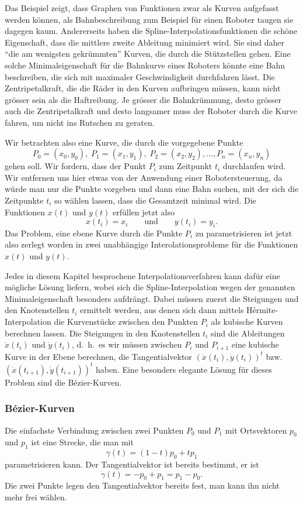 Das Beispiel zeigt, dass Graphen von Funktionen zwar als Kurven aufgefasst
werden können, als Bahnbeschreibung zum Beispiel für einen Roboter taugen
sie dagegen kaum.
Andererseits haben die Spline-Interpolationsfunktionen die schöne
Eigenschaft, dass die mittlere zweite Ableitung minimiert wird.
Sie sind daher ``die am wenigsten gekrümmten'' Kurven, die durch die
Stützstellen gehen. 
Eine solche Minimaleigenschaft für die Bahnkurve eines Roboters könnte eine
Bahn beschreiben, die sich mit maximaler Geschwindigkeit durchfahren lässt.
Die Zentripetalkraft, die die Räder in den Kurven aufbringen müssen,
kann nicht grösser sein als die Haftreibung.
Je grösser die Bahnkrümmung, desto grösser auch die Zentripetalkraft und
desto langsamer muss der Roboter durch die Kurve fahren, um nicht ins
Rutschen zu geraten.

Wir betrachten also eine Kurve, die durch die vorgegebene Punkte
\[
P_0 = (x_0, y_0),\;
P_1 = (x_1, y_1), \;
P_2 = (x_2, y_2),
\dots,
P_n=(x_n, y_n)
\]
gehen soll.
Wir fordern, dass der Punkt $P_i$ zum Zeitpunkt $t_i$ durchlaufen wird.
Wir entfernen uns hier etwas von der Anwendung einer Robotersteuerung,
da würde man nur die Punkte vorgeben und dann eine Bahn suchen, mit der
sich die Zeitpunkte $t_i$ so wählen lassen, dass die Gesamtzeit minimal
wird.
Die Funktionen $x(t)$ und $y(t)$ erfüllen jetzt also
\[
x(t_i) = x_i
\qquad\text{und}\qquad
y(t_i) = y_i.
\]
Das Problem, eine ebene Kurve durch die Punkte $P_i$ zu parametrisieren
ist jetzt also zerlegt worden in zwei unabhängige Interolationsprobleme
für die Funktionen $x(t)$ und $y(t)$.

Jedes in diesem Kapitel besprochene Interpolationsverfahren kann dafür
eine mögliche Lösung liefern, wobei sich die Spline-Interpolation wegen
der genannten Minimaleigenschaft besonders aufdrängt.
Dabei müssen zuerst die Steigungen und den Knotenstellen $t_i$ ermittelt
werden,
aus denen sich dann mittels Hérmite-Interpolation die Kurvenstücke
zwischen den Punkten $P_i$ als kubische Kurven berechnen lassen.
Die Steigungen in den Knotenstellen $t_i$ sind die Ableitungen
$\dot{x}(t_i)$ und $\dot{y}(t_i)$, d.~h.~es wir müssen zwischen
$P_i$ und $P_{i+1}$ eine kubische Kurve in der Ebene berechnen, die
Tangentialvektor $(\dot{x}(t_i),\dot{y}(t_i))^t$
bzw.~$(\dot{x}(t_{i+1}),\dot{y}(t_{i+1}))^t$ haben.
Eine besonders elegante Lösung für dieses Problem sind die Bézier-Kurven.

\subsubsection{Bézier-Kurven}
Die einfachste Verbindung zwischen zwei Punkten $P_0$ und $P_1$ mit
Ortsvektoren $p_0$ und $p_1$ ist eine Strecke, die man mit
\[
\gamma(t) = (1-t)p_0 + tp_1
\]
parametrisieren kann.
Der Tangentialvektor ist bereits bestimmt, er ist
\[
\dot{\gamma}(t) = -p_0 + p_1 = p_1-p_0.
\]
Die zwei Punkte legen den Tangentialvektor bereits fest, man kann
ihn nicht mehr frei wählen.

